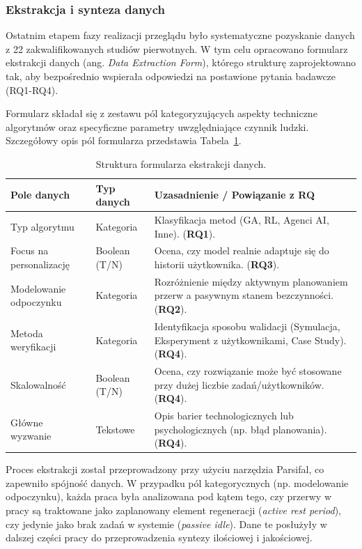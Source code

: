 \subsubsection{Ekstrakcja i synteza danych}
\quad Ostatnim etapem fazy realizacji przeglądu było systematyczne pozyskanie danych z 22 zakwalifikowanych studiów pierwotnych. W tym celu opracowano formularz ekstrakcji danych (ang. \textit{Data Extraction Form}), którego strukturę zaprojektowano tak, aby bezpośrednio wspierała odpowiedzi na postawione pytania badawcze (RQ1-RQ4).

Formularz składał się z zestawu pól kategoryzujących aspekty techniczne algorytmów oraz specyficzne parametry uwzględniające czynnik ludzki. Szczegółowy opis pól formularza przedstawia Tabela~\ref{tab:data_extraction_form}.

\begin{table}[h!]
\caption{Struktura formularza ekstrakcji danych.}
\label{tab:data_extraction_form}
\begin{tabular}{p{4cm}p{2.2cm}p{8.4cm}}
\hline
\textbf{Pole danych} & \textbf{Typ danych} & \textbf{Uzasadnienie / Powiązanie z RQ} \\ \hline
Typ algorytmu & Kategoria & Klasyfikacja metod (GA, RL, Agenci AI, Inne). (\textbf{RQ1}). \\ \hline
Focus na personalizację & Boolean (T/N) & Ocena, czy model realnie adaptuje się do historii użytkownika. (\textbf{RQ3}). \\ \hline
Modelowanie odpoczynku & Kategoria & Rozróżnienie między aktywnym planowaniem przerw a pasywnym stanem bezczynności. (\textbf{RQ2}). \\ \hline
Metoda weryfikacji & Kategoria & Identyfikacja sposobu walidacji (Symulacja, Eksperyment z użytkownikami, Case Study). (\textbf{RQ4}). \\ \hline
Skalowalność & Boolean (T/N) & Ocena, czy rozwiązanie może być stosowane przy dużej liczbie zadań/użytkowników. (\textbf{RQ4}). \\ \hline
Główne wyzwanie & Tekstowe & Opis barier technologicznych lub psychologicznych (np. błąd planowania). (\textbf{RQ4}). \\ \hline
\end{tabular}
\end{table}


\indent Proces ekstrakcji został przeprowadzony przy użyciu narzędzia Parsifal, co zapewniło spójność danych. W przypadku pól kategorycznych (np. modelowanie odpoczynku), każda praca była analizowana pod kątem tego, czy przerwy w pracy są traktowane jako zaplanowany element regeneracji (\textit{active rest period}), czy jedynie jako brak zadań w systemie (\textit{passive idle}). Dane te posłużyły w dalszej części pracy do przeprowadzenia syntezy ilościowej i jakościowej.


